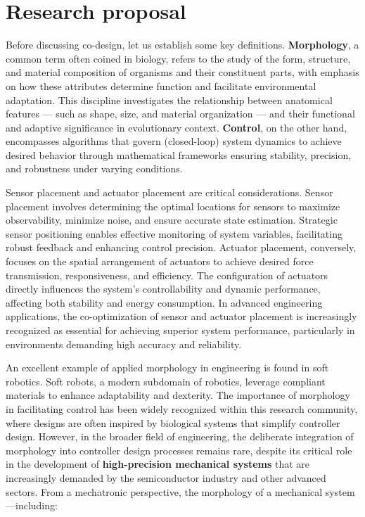 \hypertarget{research-proposal}{%
\section{Research proposal}\label{research-proposal}}

Before discussing co-design, let us establish some key definitions.
\textbf{Morphology}, a common term often coined in biology, refers to
the study of the form, structure, and material composition of organisms
and their constituent parts, with emphasis on how these attributes
determine function and facilitate environmental adaptation. This
discipline investigates the relationship between anatomical features ---
such as shape, size, and material organization --- and their functional
and adaptive significance in evolutionary context. \textbf{Control}, on
the other hand, encompasses algorithms that govern (closed-loop) system
dynamics to achieve desired behavior through mathematical frameworks
ensuring stability, precision, and robustness under varying conditions.

Sensor placement and actuator placement are critical considerations.
Sensor placement involves determining the optimal locations for sensors
to maximize observability, minimize noise, and ensure accurate state
estimation. Strategic sensor positioning enables effective monitoring of
system variables, facilitating robust feedback and enhancing control
precision. Actuator placement, conversely, focuses on the spatial
arrangement of actuators to achieve desired force transmission,
responsiveness, and efficiency. The configuration of actuators directly
influences the system's controllability and dynamic performance,
affecting both stability and energy consumption. In advanced engineering
applications, the co-optimization of sensor and actuator placement is
increasingly recognized as essential for achieving superior system
performance, particularly in environments demanding high accuracy and
reliability.

An excellent example of applied morphology in engineering is found in
soft robotics. Soft robots, a modern subdomain of robotics, leverage
compliant materials to enhance adaptability and dexterity. The
importance of morphology in facilitating control has been widely
recognized within this research community, where designs are often
inspired by biological systems that simplify controller design. However,
in the broader field of engineering, the deliberate integration of
morphology into controller design processes remains rare, despite its
critical role in the development of \textbf{high-precision mechanical
systems} that are increasingly demanded by the semiconductor industry
and other advanced sectors. From a mechatronic perspective, the
morphology of a mechanical system---including:

